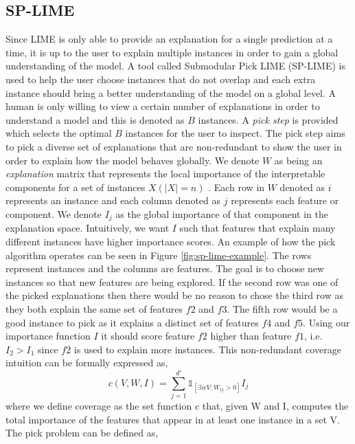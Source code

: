 \subsection{SP-LIME}
Since LIME is only able to provide an explanation for a single prediction at a time, it is up to the user to explain multiple instances in order to gain a global understanding of the model. A tool called Submodular Pick LIME (SP-LIME) \cite{lime} is used to help the user choose instances that do not overlap and each extra instance should bring a better understanding of the model on a global level. A human is only willing to view a certain number of explanations in order to understand a model and this is denoted as $B$ instances. A \emph{pick step} is provided which selects  the optimal $B$ instances for the user to inspect. The pick step aims to pick a diverse set of explanations that are non-redundant to show the user in order to explain how the model behaves globally. We denote $W$ as being an \emph{explanation} matrix that represents the local importance of the interpretable components for a set of instances $X (|X| = n)$ \cite{lime}. Each row in $W$ denoted as $i$ represents an instance and each column denoted as $j$ represents each feature or component. We denote $I_{j}$ as the global importance of that component in the explanation space. Intuitively,  we  want $I$ such  that features that explain many different instances have higher importance scores. An example of how the pick algorithm operates can be seen in Figure \ref{fig:sp-lime-example}. The rows represent instances and the columns are features. The goal is to choose new instances so that new features are being explored. If the second row was one of the picked explanations then there would be no reason to chose the third row as they both explain the same set of features $f2$ and $f3$. The fifth row would be a good instance to pick as it explains a distinct set of features $f4$ and $f5$. Using our importance function $I$ it should score feature $f2$ higher than feature $f1$, i.e. $I_{2} > I_{1}$ since $f2$ is used to explain more instances. This non-redundant  coverage intuition can be formally expressed as,
\begin{equation}
    c(V,W,I) = \sum^{d'}_{j=1} \mathds{1}_{[\exists i \epsilon V : W_{ij} > 0]}I_{j}
    \label{eq:coverage-inution}
\end{equation}
where we define coverage as the set function c that, given W and I, computes the total importance of the features that appear in at least one instance in a set V.
The pick problem can be defined as,
